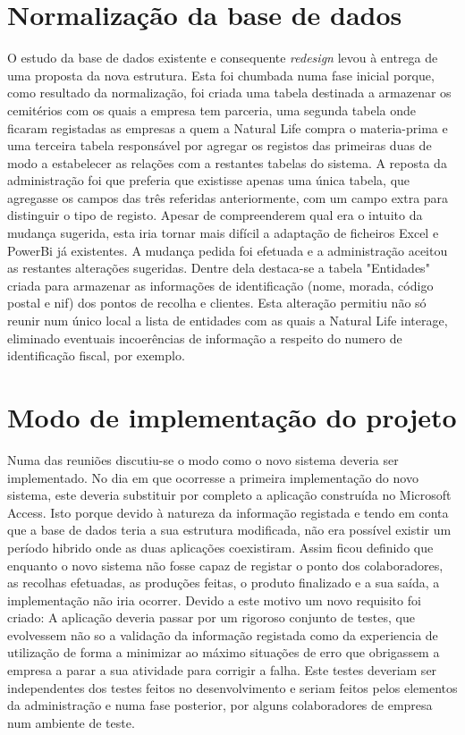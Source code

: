 \section{Normalização da base de dados}
O estudo da base de dados existente e consequente \textit{redesign} levou à entrega de uma proposta da nova estrutura. Esta foi chumbada numa fase inicial porque, como resultado da normalização, foi criada uma tabela destinada a armazenar os cemitérios com os quais a empresa tem parceria, uma segunda tabela onde ficaram registadas as empresas a quem a Natural Life compra o materia-prima e uma terceira tabela responsável por agregar os registos das primeiras duas de modo a estabelecer as relações com a restantes tabelas do sistema. A reposta da administração foi que preferia que existisse apenas uma única tabela, que agregasse os campos das três referidas anteriormente, com um campo extra para distinguir o tipo de registo. Apesar de compreenderem qual era o intuito da mudança sugerida, esta iria tornar mais difícil a adaptação de ficheiros Excel e PowerBi já existentes. A mudança pedida foi efetuada e a administração aceitou as restantes alterações sugeridas. Dentre dela destaca-se a tabela "Entidades" criada para armazenar as informações de identificação (nome, morada, código postal e nif) dos pontos de recolha e clientes. Esta alteração permitiu não só reunir num único local a lista de entidades com as quais a Natural Life interage, eliminado eventuais incoerências de informação a respeito do numero de identificação fiscal, por exemplo.

\section{Modo de implementação do projeto}
Numa das reuniões discutiu-se o modo como o novo sistema deveria ser implementado. No dia em que ocorresse a primeira implementação do novo sistema, este deveria substituir por completo a aplicação construída no Microsoft Access. Isto porque devido à natureza da informação registada e tendo em conta que a base de dados teria a sua estrutura modificada, não era possível existir um período hibrido onde as duas aplicações coexistiram. Assim ficou definido que enquanto o novo sistema não fosse capaz de registar o ponto dos colaboradores, as recolhas efetuadas, as produções feitas, o produto finalizado e a sua saída, a implementação não iria ocorrer. Devido a este motivo um novo requisito foi criado: A aplicação deveria passar por um rigoroso conjunto de testes, que evolvessem não so a validação da informação registada como da experiencia de utilização de forma a minimizar ao máximo situações de erro que obrigassem a empresa a parar a sua atividade para corrigir a falha. Este testes deveriam ser independentes dos testes feitos no desenvolvimento e seriam feitos pelos elementos da administração e numa fase posterior, por alguns colaboradores de empresa num ambiente de teste.


